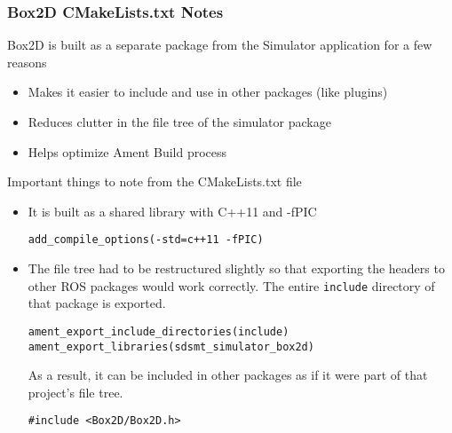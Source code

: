 \subsubsection*{Box2D CMakeLists.txt Notes}
Box2D is built as a separate package from the Simulator application for a few reasons
\begin{itemize}
	\item Makes it easier to include and use in other packages (like plugins)
	\item Reduces clutter in the file tree of the simulator package
	\item Helps optimize Ament Build process
\end{itemize}

Important things to note from the CMakeLists.txt file
\begin{itemize}
	\item It is built as a shared library with C++11 and -fPIC
	\begin{lstlisting}
add_compile_options(-std=c++11 -fPIC)
	\end{lstlisting}
	\item The file tree had to be restructured slightly so that exporting the headers to other ROS packages would work correctly. The entire \lstinline|include| directory of that package is exported.

	\begin{lstlisting}
ament_export_include_directories(include)
ament_export_libraries(sdsmt_simulator_box2d)
	\end{lstlisting}
	As a result, it can be included in other packages as if it were part of that project's file tree.
	\begin{lstlisting}
#include <Box2D/Box2D.h>
	\end{lstlisting}
\end{itemize}
